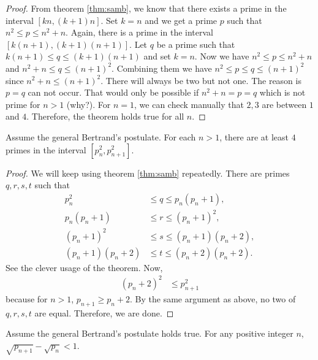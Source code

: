 \documentclass{subfile}
\begin{document}
	\begin{proof}
		From theorem \eqref{thm:samb}, we know that there exists a prime in the interval $[kn, (k+1)n]$. Set $k=n$ and we get a prime $p$ such that $n^2\leq p\leq n^2+n$. Again, there is a prime in the interval $[k(n+1),(k+1)(n+1)]$. Let $q$ be a prime such that $k(n+1)\leq q\leq (k+1)(n+1)$ and set $k=n$. Now we have $n^2\leq p\leq n^2+n$ and $n^2+n\leq q\leq (n+1)^2$. Combining them we have $n^2\leq p\leq q\leq (n+1)^2$ since $n^2+n\leq(n+1)^2$. There will always be two but not one. The reason is $p=q$ can not occur. That would only be possible if $n^2+n=p=q$ which is not prime for $n>1$ (why?).
		For $n=1$, we can check manually that $2,3$ are between $1$ and $4$. Therefore, the theorem holds true for all $n$.
	\end{proof}
	
	\begin{theorem}
		Assume the general Bertrand's postulate. For each $n>1$, there are at least $4$ primes in the interval $[p_n^2,p_{n+1}^2]$.
	\end{theorem}

	\begin{proof}
		We will keep using theorem \eqref{thm:samb} repeatedly. There are primes $q,r,s,t$ such that
			\begin{align*}
				p_n^2 & \leq q\leq p_n(p_n+1),\\
				p_n(p_n+1) & \leq r \leq (p_n+1)^2,\\
				(p_n+1)^2 & \leq s\leq (p_n+1)(p_n+2),\\
				(p_n+1)(p_n+2) & \leq t\leq (p_n+2)(p_n+2).
			\end{align*}
		See the clever usage of the theorem. Now,
			\begin{align*}
				(p_n+2)^2 & \leq p_{n+1}^2
			\end{align*}
		because for $n>1$, $p_{n+1}\geq p_n+2$. By the same argument as above, no two of $q,r,s,t$ are equal. Therefore, we are done.
	\end{proof}
	
	\begin{theorem}
		Assume the general Bertrand's postulate holds true. For any positive integer $n$, $\sqrt{p_{n+1}}-\sqrt{p_n}<1$.
	\end{theorem}
	
\end{document}

